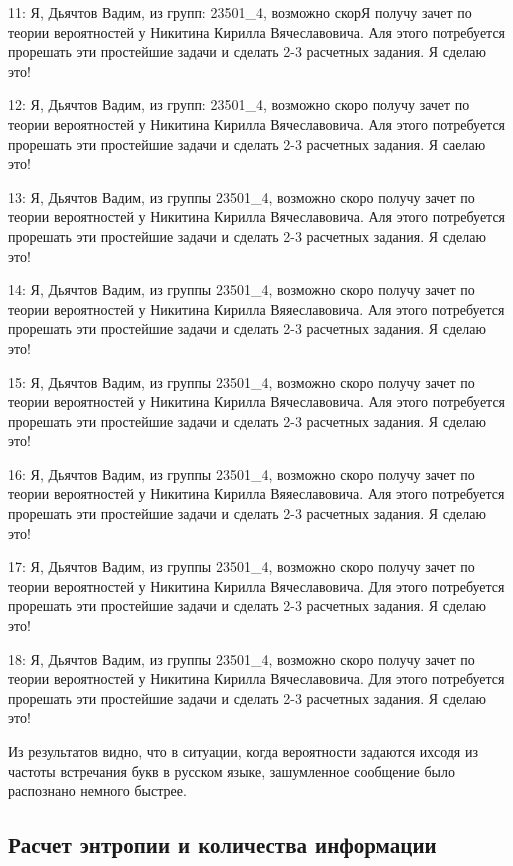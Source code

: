 {11: Я, Дьячтов Вадим, из групп: 23501\_4, возможно скорЯ получу зачет по теории вероятностей у Никитина Кирилла Вячеславовича. Аля этого потребуется прорешать эти простейшие задачи и сделать 2-3 расчетных задания. Я сделаю это!

12: Я, Дьячтов Вадим, из групп: 23501\_4, возможно скоро получу зачет по теории вероятностей у Никитина Кирилла Вячеславовича. Аля этого потребуется прорешать эти простейшие задачи и сделать 2-3 расчетных задания. Я саелаю это!

13: Я, Дьячтов Вадим, из группы 23501\_4, возможно скоро получу зачет по теории вероятностей у Никитина Кирилла Вячеславовича. Аля этого потребуется прорешать эти простейшие задачи и сделать 2-3 расчетных задания. Я сделаю это!

14: Я, Дьячтов Вадим, из группы 23501\_4, возможно скоро получу зачет по теории вероятностей у Никитина Кирилла Вяяеславовича. Аля этого потребуется прорешать эти простейшие задачи и сделать 2-3 расчетных задания. Я сделаю это!

15: Я, Дьячтов Вадим, из группы 23501\_4, возможно скоро получу зачет по теории вероятностей у Никитина Кирилла Вячеславовича. Аля этого потребуется прорешать эти простейшие задачи и сделать 2-3 расчетных задания. Я сделаю это!

16: Я, Дьячтов Вадим, из группы 23501\_4, возможно скоро получу зачет по теории вероятностей у Никитина Кирилла Вяяеславовича. Аля этого потребуется прорешать эти простейшие задачи и сделать 2-3 расчетных задания. Я сделаю это!

17: Я, Дьячтов Вадим, из группы 23501\_4, возможно скоро получу зачет по теории вероятностей у Никитина Кирилла Вячеславовича. Для этого потребуется прорешать эти простейшие задачи и сделать 2-3 расчетных задания. Я сделаю это!

18: Я, Дьячтов Вадим, из группы 23501\_4, возможно скоро получу зачет по теории вероятностей у Никитина Кирилла Вячеславовича. Для этого потребуется прорешать эти простейшие задачи и сделать 2-3 расчетных задания. Я сделаю это!

}

Из результатов видно, что в ситуации, когда вероятности задаются ихсодя из частоты встречания букв в русском языке, зашумленное сообщение было распознано немного быстрее.

\subsection{Расчет энтропии и количества информации}

